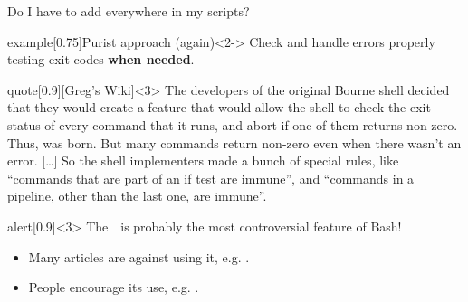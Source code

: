 \begin{frame}{Do I have to add \;\; everywhere in my scripts?}
    \vspace{-2mm}
    \begin{varblock}{example}[0.75\textwidth]{Purist approach (again)}<2->
        Check and handle errors properly testing exit codes \textbf{when needed}.
    \end{varblock}
    \begin{varblock}{quote}[0.9\textwidth]{}[Greg's Wiki]<3>
        The developers of the original Bourne shell decided that they would create a feature that would allow the shell to check the exit status of every command that it runs, and abort if one of them returns non-zero.
        Thus,  was born.
        But many commands return non-zero even when there wasn't an error.
        [\ldots]
        So the shell implementers made a bunch of special rules, like ``commands that are part of an if test are immune'', and ``commands in a pipeline, other than the last one, are immune''.
    \end{varblock}
    \begin{varblock}{alert}[0.9\textwidth]{}<3>
        \alert{The \,\, is probably the most controversial feature of Bash!}
    \end{varblock}
    \begin{itemize}[<3>]
        \item Many articles are against using it, e.g. .
        \item People encourage its use, e.g. .
    \end{itemize}
\end{frame}
